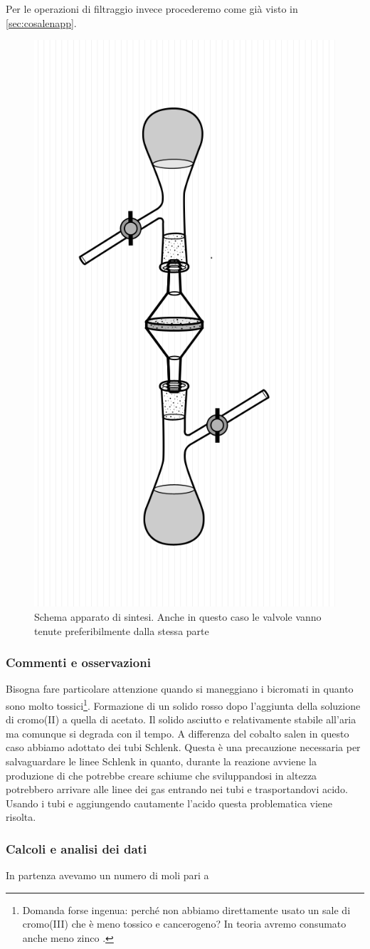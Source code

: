 Per le operazioni di filtraggio invece procederemo come già visto in \autoref{sec:cosalenapp}.



\begin{figure}[ht!]
    \centering
    \includegraphics[width=0.3\linewidth]{foto/apparatooliva.png}
    \caption{Schema apparato di sintesi. Anche in questo caso le valvole vanno tenute preferibilmente dalla stessa parte}
    \label{fig:cracetao}
\end{figure}


\subsubsection{Commenti e osservazioni}

Bisogna fare particolare attenzione quando si maneggiano i bicromati in quanto sono molto tossici\footnote{Domanda forse ingenua: perché non abbiamo direttamente usato un sale di cromo(III) che è meno tossico e cancerogeno? In teoria avremo consumato anche meno zinco  \cite{cancer}.}. 
Formazione di un solido rosso dopo l'aggiunta della soluzione di cromo(II) a quella di acetato. 
Il solido asciutto e relativamente stabile all'aria ma comunque si degrada con il tempo. A differenza del cobalto salen in questo caso abbiamo adottato dei tubi Schlenk. Questa è una precauzione necessaria per salvaguardare le linee Schlenk in quanto, durante la reazione avviene la produzione di  che potrebbe creare schiume che sviluppandosi in altezza potrebbero arrivare alle linee dei gas entrando nei tubi e trasportandovi acido. Usando i tubi e aggiungendo cautamente l'acido questa problematica viene risolta.


\subsubsection{Calcoli e analisi dei dati}
In partenza avevamo un numero di moli pari a


